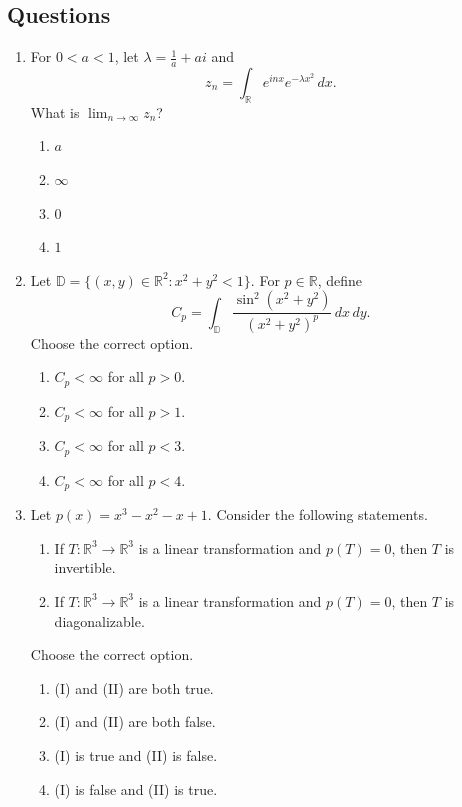 \documentclass[11pt, a4paper]{article}
\begin{document}
\subsection*{Questions}
\begin{enumerate}
  \item For $0 < a < 1$, let $\lambda = \frac{1}{a} + ai$ and
  \[
    z_n = \int_{\mathbb{R}} e^{inx} e^{-\lambda x^2}\,dx.
  \]
  What is $\lim_{n \to \infty} z_n$?
  \begin{enumerate}[label=(\alph*)]
    \item $a$
    \item $\infty$
    \item $0$
    \item $1$
  \end{enumerate}

  \item Let $\mathbb{D} = \{(x, y) \in \mathbb{R}^2 : x^2 + y^2 < 1\}$. For $p \in \mathbb{R}$, define
  \[
    C_p = \int_{\mathbb{D}} \frac{\sin^2(x^2 + y^2)}{(x^2 + y^2)^p}\,dx\,dy.
  \]
  Choose the correct option.
  \begin{enumerate}[label=(\alph*)]
    \item $C_p < \infty$ for all $p > 0$.
    \item $C_p < \infty$ for all $p > 1$.
    \item $C_p < \infty$ for all $p < 3$.
    \item $C_p < \infty$ for all $p < 4$.
  \end{enumerate}

  \item Let $p(x) = x^3 - x^2 - x + 1$. Consider the following statements.
  \begin{enumerate}[label=(\Roman*)]
    \item If $T: \mathbb{R}^3 \to \mathbb{R}^3$ is a linear transformation and $p(T) = 0$, then $T$ is invertible.
    \item If $T: \mathbb{R}^3 \to \mathbb{R}^3$ is a linear transformation and $p(T) = 0$, then $T$ is diagonalizable.
  \end{enumerate}
  Choose the correct option.
  \begin{enumerate}[label=(\alph*)]
    \item (I) and (II) are both true.
    \item (I) and (II) are both false.
    \item (I) is true and (II) is false.
    \item (I) is false and (II) is true.
  \end{enumerate}


\end{enumerate}
\end{document}
